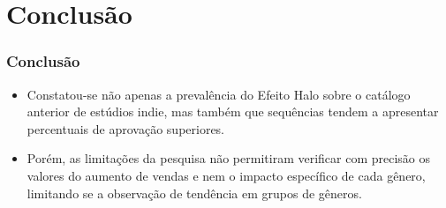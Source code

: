 \section{Conclusão}
\begin{frame}
\frametitle{Conclusão}
\justifying

\begin{itemize}
    \item  Constatou-se não apenas a prevalência
do Efeito Halo sobre o catálogo anterior de estúdios indie,
mas também que sequências tendem a apresentar percentuais
de aprovação superiores.
    \vspace{0.2cm}

    \item Porém, as limitações da pesquisa não permitiram verificar com precisão os valores
    do aumento de vendas e nem o impacto específico de cada gênero, limitando se a 
    observação de tendência em grupos de gêneros.
    \vspace{0.2cm}

\end{itemize}    
\end{frame}